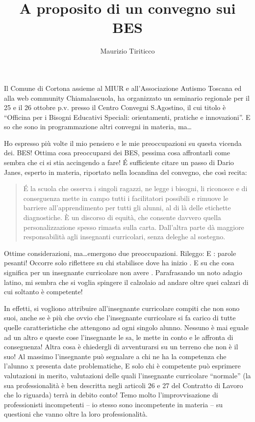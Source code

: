 \author{Maurizio Tiriticco}
\title{A proposito di un convegno sui BES}
\label{cha:Maurizio Tiriticco221013}
\maketitle
{}
Il Comune di Cortona assieme al MIUR e all'Associazione Autismo Toscana ed alla web community Chiamalascuola, ha organizzato un seminario regionale per il 25 e il 26 ottobre p.v. presso il Centro Convegni S.Agostino, il cui titolo è “Officina per i Bisogni Educativi Speciali: orientamenti, pratiche e innovazioni”. E so che sono in programmazione altri convegni in materia, ma\dots

Ho espresso più volte il mio pensiero e le mie preoccupazioni su questa vicenda dei. BES! Ottima cosa preoccuparsi dei BES, pessima cosa affrontarli come sembra che ci si stia accingendo a fare! \'{E} sufficiente citare un passo di Dario Janes, esperto in materia, riportato nella locandina del convegno, che così recita: 
\begin{quote}
\'{E} la scuola che osserva i singoli ragazzi, ne legge i bisogni, li riconosce e di conseguenza mette in campo tutti i facilitatori possibili e rimuove le barriere all'apprendimento per tutti gli alunni, al di là delle etichette diagnostiche. È un discorso di equità, che consente davvero quella personalizzazione spesso rimasta sulla carta. Dall'altra parte dà maggiore responsabilità agli insegnanti curricolari, senza deleghe al sostegno.
\end{quote}
Ottime considerazioni, ma\dots emergono due preoccupazioni. Rileggo:  E : parole pesanti! Occorre solo riflettere su chi stabilisce dove ha inizio . E su che cosa significa per un insegnante curricolare non avere . Parafrasando un noto adagio latino, mi sembra che si voglia spingere il calzolaio ad andare oltre quei calzari di cui soltanto è competente!

In effetti, si vogliono attribuire all'insegnante curricolare compiti che non sono suoi, anche se è più che ovvio che l'insegnante curricolare si fa carico di tutte quelle caratteristiche che attengono ad ogni singolo alunno. Nessuno è mai eguale ad un altro e queste cose l'insegnante le sa, le mette in conto e le affronta di conseguenza! Altra cosa è chiedergli di avventurarsi su un terreno che non è il suo! Al massimo l'insegnante può segnalare a chi ne ha la competenza che l'alunno x presenta date problematiche, E solo chi è competente può esprimere valutazioni in merito, valutazioni delle quali l'insegnante curricolare “normale” (la sua professionalità è ben descritta negli articoli 26 e 27 del Contratto di Lavoro che lo riguarda) terrà in debito conto! Temo molto l'improvvisazione di professionisti incompetenti – io stesso sono incompetente in materia – su questioni che vanno oltre la loro professionalità.

